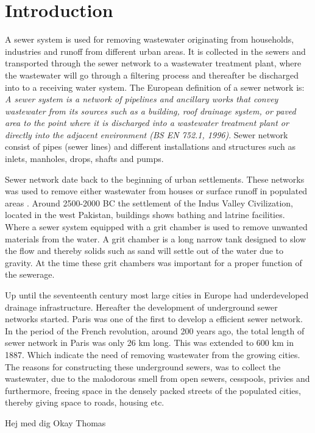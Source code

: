 \chapter{Introduction}
\label{ch:introduction}
A sewer system is used for removing wastewater originating from households, industries and runoff from different urban areas. It is collected in the sewers and transported through the sewer network to a wastewater treatment plant, where the wastewater will go through a filtering process and thereafter be discharged into to a receiving water system. The European definition of a sewer network is: \textit{A sewer system is a network of pipelines and ancillary works that convey wastewater from its sources such as a building, roof drainage system, or paved area to the point where it is discharged into a wastewater treatment plant or directly into the adjacent environment (BS EN 752.1, 1996)}. Sewer network consist of pipes (sewer lines) and different installations and structures such as inlets, manholes, drops, shafts and pumps.

Sewer network date back to the beginning of urban settlements. These networks was used to remove either wastewater from houses or surface runoff in populated areas . Around 2500-2000 BC the settlement of the Indus Valley Civilization, located in the west Pakistan, buildings shows bathing and latrine facilities. Where a sewer system equipped with a grit chamber is used to remove unwanted materials from the water. A grit chamber is a long narrow tank designed to slow the flow and thereby solids such as sand will settle out of the water due to gravity. At the time these grit chambers was important for a proper function of the sewerage.

Up until the seventeenth century most large cities in Europe had underdeveloped drainage infrastructure. Hereafter the development of underground sewer networks started. Paris was one of the first to develop a efficient sewer network. In the period of the French revolution, around 200 years ago, the total length of sewer network in Paris was only 26 km long. This was extended to 600 km in 1887. Which indicate the need of removing wastewater from the growing cities. The reasons for constructing these underground sewers, was to collect the wastewater, due to the malodorous smell from open sewers, cesspools, privies and furthermore, freeing space in the densely packed streets of the populated cities, thereby giving space to roads, housing etc.

Hej med dig Okay Thomas 
